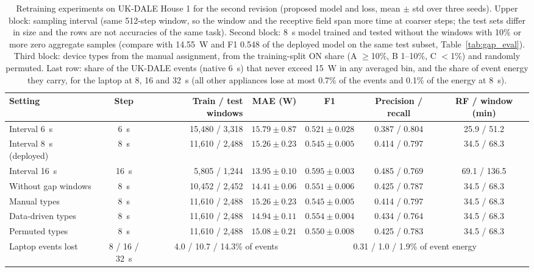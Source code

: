 \begin{table}[H]
\centering
\caption{Retraining experiments on UK-DALE House 1 for the second revision (proposed model and loss, mean $\pm$ std over three seeds). Upper block: sampling interval (same 512-step window, so the window and the receptive field span more time at coarser steps; the test sets differ in size and the rows are not accuracies of the same task). Second block: 8~s model trained and tested without the windows with 10\% or more zero aggregate samples (compare with 14.55~W and F1 0.548 of the deployed model on the same test subset, Table~\ref{tab:gap_eval}). Third block: device types from the manual assignment, from the training-split ON share (A $\ge$10\%, B 1--10\%, C $<$1\%) and randomly permuted. Last row: share of the UK-DALE events (native 6~s) that never exceed 15~W in any averaged bin, and the share of event energy they carry, for the laptop at 8, 16 and 32~s (all other appliances lose at most 0.7\% of the events and 0.1\% of the energy at 8~s).}
\label{tab:round2_retrain}
\footnotesize
\begin{tabular}{@{}lcrrccc@{}}
\toprule
Setting & Step & Train / test windows & MAE (W) & F1 & Precision / recall & RF / window (min) \\
\midrule
Interval 6~s & 6~s & 15,480 / 3,318 & $15.79\pm0.87$ & $0.521\pm0.028$ & 0.387 / 0.804 & 25.9 / 51.2 \\
Interval 8~s (deployed) & 8~s & 11,610 / 2,488 & $15.26\pm0.23$ & $0.545\pm0.005$ & 0.414 / 0.797 & 34.5 / 68.3 \\
Interval 16~s & 16~s & 5,805 / 1,244 & $13.95\pm0.10$ & $0.595\pm0.003$ & 0.485 / 0.769 & 69.1 / 136.5 \\
\midrule
Without gap windows & 8~s & 10,452 / 2,452 & $14.41\pm0.06$ & $0.551\pm0.006$ & 0.425 / 0.787 & 34.5 / 68.3 \\
\midrule
Manual types & 8~s & 11,610 / 2,488 & $15.26\pm0.23$ & $0.545\pm0.005$ & 0.414 / 0.797 & 34.5 / 68.3 \\
Data-driven types & 8~s & 11,610 / 2,488 & $14.94\pm0.11$ & $0.554\pm0.004$ & 0.434 / 0.764 & 34.5 / 68.3 \\
Permuted types & 8~s & 11,610 / 2,488 & $15.08\pm0.21$ & $0.550\pm0.008$ & 0.425 / 0.783 & 34.5 / 68.3 \\
\midrule
Laptop events lost & 8 / 16 / 32~s & \multicolumn{2}{c}{4.0 / 10.7 / 14.3\% of events} & \multicolumn{3}{c}{0.31 / 1.0 / 1.9\% of event energy} \\
\bottomrule
\end{tabular}
\end{table}

